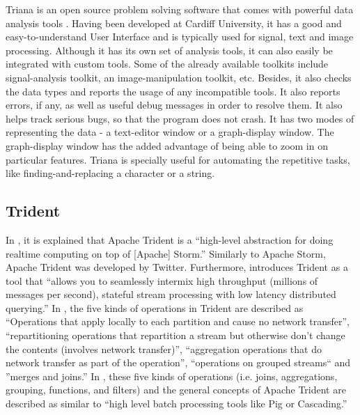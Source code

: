    Triana is an open source problem solving software that comes with 
   powerful data analysis tools \cite{trianaDocumentation-1}.
   Having been developed at Cardiff University, it has a good and
   easy-to-understand User Interface and is typically used for signal,
   text and image processing.  Although it has its own set of analysis
   tools, it can also easily be integrated with custom tools.  Some of
   the already available toolkits include signal-analysis toolkit, an
   image-manipulation toolkit, etc.  Besides, it also checks the data
   types and reports the usage of any incompatible tools.  It also
   reports errors, if any, as well as useful debug messages in order
   to resolve them.  It also helps track serious bugs, so that the
   program does not crash.  It has two modes of representing the
   data - a text-editor window or a graph-display window.  The
   graph-display window has the added advantage of being able to zoom
   in on particular features.  Triana is specially useful for
   automating the repetitive tasks, like finding-and-replacing a
   character or a string.
   
\subsection{Trident}

   In \cite{www-trident-tutorial}, it is explained that Apache Trident 
   is a ``high-level abstraction for doing realtime computing on top of 
   [Apache] Storm.'' Similarly to Apache Storm, Apache Trident was 
   developed by Twitter. Furthermore, \cite{www-trident-tutorial} 
   introduces Trident as a tool that ``allows you to seamlessly intermix 
   high throughput (millions of messages per second), stateful stream 
   processing with low latency distributed querying.'' In 
   \cite{www-trident-overview}, the five kinds of operations in 
   Trident are described as ``Operations that apply locally to each 
   partition and cause no network transfer'', ``repartitioning operations 
   that repartition a stream but otherwise don't change the contents 
   (involves network transfer)'', ``aggregation operations that do 
   network transfer as part of the operation'', ``operations on grouped 
   streams`` and ''merges and joins.'' In \cite{www-trident-tutorial}, 
   these five kinds of operations (i.e. joins, aggregations, grouping, 
   functions, and filters) and the general concepts of Apache Trident 
   are described as similar to ``high level batch processing tools like 
   Pig or Cascading.''

